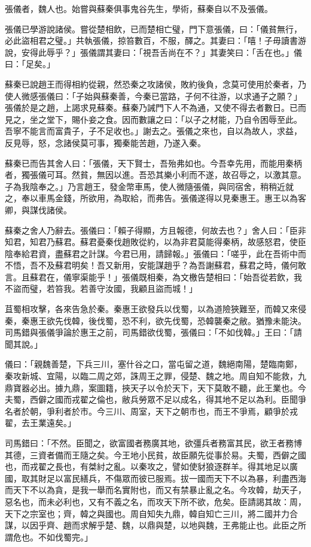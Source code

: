 
\begin{pinyinscope}
張儀者，魏人也。始嘗與蘇秦俱事鬼谷先生，學術，蘇秦自以不及張儀。

張儀已學游說諸侯。嘗從楚相飲，已而楚相亡璧，門下意張儀，曰：「儀貧無行，必此盜相君之璧。」共執張儀，掠笞數百，不服，醳之。其妻曰：「嘻！子毋讀書游說，安得此辱乎？」張儀謂其妻曰：「視吾舌尚在不？」其妻笑曰：「舌在也。」儀曰：「足矣。」

蘇秦已說趙王而得相約從親，然恐秦之攻諸侯，敗約後負，念莫可使用於秦者，乃使人微感張儀曰：「子始與蘇秦善，今秦已當路，子何不往游，以求通子之願？」張儀於是之趙，上謁求見蘇秦。蘇秦乃誡門下人不為通，又使不得去者數日。已而見之，坐之堂下，賜仆妾之食。因而數讓之曰：「以子之材能，乃自令困辱至此。吾寧不能言而富貴子，子不足收也。」謝去之。張儀之來也，自以為故人，求益，反見辱，怒，念諸侯莫可事，獨秦能苦趙，乃遂入秦。

蘇秦已而告其舍人曰：「張儀，天下賢士，吾殆弗如也。今吾幸先用，而能用秦柄者，獨張儀可耳。然貧，無因以進。吾恐其樂小利而不遂，故召辱之，以激其意。子為我陰奉之。」乃言趙王，發金幣車馬，使人微隨張儀，與同宿舍，稍稍近就之，奉以車馬金錢，所欲用，為取給，而弗告。張儀遂得以見秦惠王。惠王以為客卿，與謀伐諸侯。

蘇秦之舍人乃辭去。張儀曰：「賴子得顯，方且報德，何故去也？」舍人曰：「臣非知君，知君乃蘇君。蘇君憂秦伐趙敗從約，以為非君莫能得秦柄，故感怒君，使臣陰奉給君資，盡蘇君之計謀。今君已用，請歸報。」張儀曰：「嗟乎，此在吾術中而不悟，吾不及蘇君明矣！吾又新用，安能謀趙乎？為吾謝蘇君，蘇君之時，儀何敢言。且蘇君在，儀寧渠能乎！」張儀既相秦，為文檄告楚相曰：「始吾從若飲，我不盜而璧，若笞我。若善守汝國，我顧且盜而城！」

苴蜀相攻擊，各來告急於秦。秦惠王欲發兵以伐蜀，以為道險狹難至，而韓又來侵秦，秦惠王欲先伐韓，後伐蜀，恐不利，欲先伐蜀，恐韓襲秦之敝。猶豫未能決。司馬錯與張儀爭論於惠王之前，司馬錯欲伐蜀，張儀曰：「不如伐韓。」王曰：「請聞其說。」

儀曰：「親魏善楚，下兵三川，塞什谷之口，當屯留之道，魏絕南陽，楚臨南鄭，秦攻新城、宜陽，以臨二周之郊，誅周王之罪，侵楚、魏之地。周自知不能救，九鼎寶器必出。據九鼎，案圖籍，挾天子以令於天下，天下莫敢不聽，此王業也。今夫蜀，西僻之國而戎翟之倫也，敝兵勞眾不足以成名，得其地不足以為利。臣聞爭名者於朝，爭利者於市。今三川、周室，天下之朝市也，而王不爭焉，顧爭於戎翟，去王業遠矣。」

司馬錯曰：「不然。臣聞之，欲富國者務廣其地，欲彊兵者務富其民，欲王者務博其德，三資者備而王隨之矣。今王地小民貧，故臣願先從事於易。夫蜀，西僻之國也，而戎翟之長也，有桀紂之亂。以秦攻之，譬如使豺狼逐群羊。得其地足以廣國，取其財足以富民繕兵，不傷眾而彼已服焉。拔一國而天下不以為暴，利盡西海而天下不以為貪，是我一舉而名實附也，而又有禁暴止亂之名。今攻韓，劫天子，惡名也，而未必利也，又有不義之名，而攻天下所不欲，危矣。臣請謁其故：周，天下之宗室也；齊，韓之與國也。周自知失九鼎，韓自知亡三川，將二國并力合謀，以因乎齊、趙而求解乎楚、魏，以鼎與楚，以地與魏，王弗能止也。此臣之所謂危也。不如伐蜀完。」


\end{pinyinscope}
